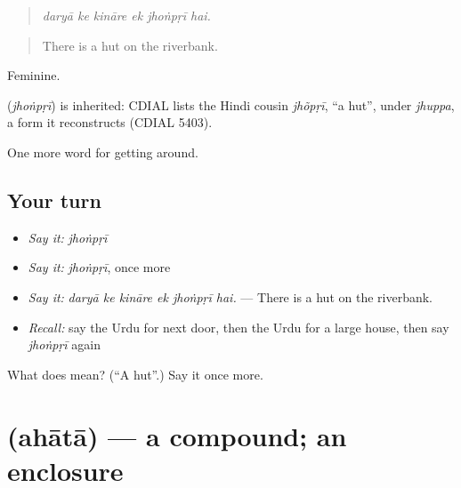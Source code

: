 \begin{quote}
     
\end{quote}

\begin{quote}
\emph{daryā ke kināre ek jhoṅpṛī hai.}
\end{quote}

\begin{quote}
There is a hut on the riverbank.
\end{quote}

Feminine.

\begin{cousinweb}
\textbf{} (\emph{jhoṅpṛī}) is inherited: CDIAL lists the Hindi cousin \emph{jhõpṛī}, \textquotedblleft{}a hut\textquotedblright{}, under \emph{jhuppa}, a form it reconstructs (CDIAL 5403).
\end{cousinweb}

\begin{grammarlens}[title={What you've built}]
One more word for getting around.
\end{grammarlens}

\subsection*{Your turn}
\begin{itemize}
\raggedright
  \item \emph{Say it:} \emph{jhoṅpṛī}
  \item \emph{Say it:} \emph{jhoṅpṛī}, once more
  \item \emph{Say it:} \emph{daryā ke kināre ek jhoṅpṛī hai.} — There is a hut on the riverbank.
  \item \emph{Recall:} say the Urdu for next door, then the Urdu for a large house, then say \emph{jhoṅpṛī} again
\end{itemize}

\begin{tcolorbox}[breakable,colback=teal!4,colframe=teal!35!black,title={Before you move on}]
What does  mean? (\textquotedblleft{}A hut\textquotedblright{}.) Say it once more.
\end{tcolorbox}
\section[\texorpdfstring{\ur{احاطہ} (ahātā)}{احاطہ (ahātā)}]{ (ahātā) — a compound; an enclosure}

